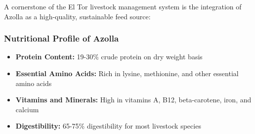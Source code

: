 A cornerstone of the El Tor livestock management system is the integration of Azolla as a high-quality, sustainable feed source:

\subsubsection{Nutritional Profile of Azolla}
\begin{itemize}
    \item \textbf{Protein Content:} 19-30\% crude protein on dry weight basis
    \item \textbf{Essential Amino Acids:} Rich in lysine, methionine, and other essential amino acids
    \item \textbf{Vitamins and Minerals:} High in vitamins A, B12, beta-carotene, iron, and calcium
    \item \textbf{Digestibility:} 65-75\% digestibility for most livestock species
\end{itemize}

